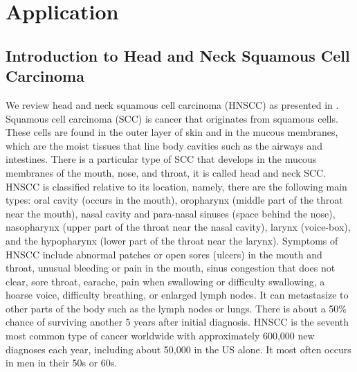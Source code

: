\documentclass[\main/thesis.tex]{subfiles}
\begin{document}
\section{Application}

\subsection{Introduction to Head and Neck Squamous Cell Carcinoma}

We review head and neck squamous cell carcinoma (HNSCC) as presented in \cite{medlineplus.gov_2021}. Squamous cell carcinoma (SCC) is cancer that originates from squamous cells. These cells are found in the outer layer of skin and in the mucous membranes, which are the moist tissues that line body cavities such as the airways and intestines. There is a particular type of SCC that develops in the mucous membranes of the mouth, nose, and throat, it is called head and neck SCC. HNSCC is classified relative to its location, namely, there are the following main types: oral cavity (occurs in the mouth), oropharynx (middle part of the throat near the mouth), nasal cavity and para-nasal sinuses (space behind the nose), nasopharynx (upper part of the throat near the nasal cavity), larynx (voice-box), and the hypopharynx (lower part of the throat near the larynx). Symptoms of HNSCC include abnormal patches or open sores (ulcers) in the mouth and throat, unusual bleeding or pain in the mouth, sinus congestion that does not clear, sore throat, earache, pain when swallowing or difficulty swallowing, a hoarse voice, difficulty breathing, or enlarged lymph nodes. It can metastasize to other parts of the body such as the lymph nodes or lungs. There is about a 50\% chance of surviving another 5 years after initial diagnosis. HNSCC is the seventh most common type of cancer worldwide with approximately 600,000 new diagnoses each year, including about 50,000 in the US alone. It most often occurs in men in their 50s or 60s. 
\end{document}
